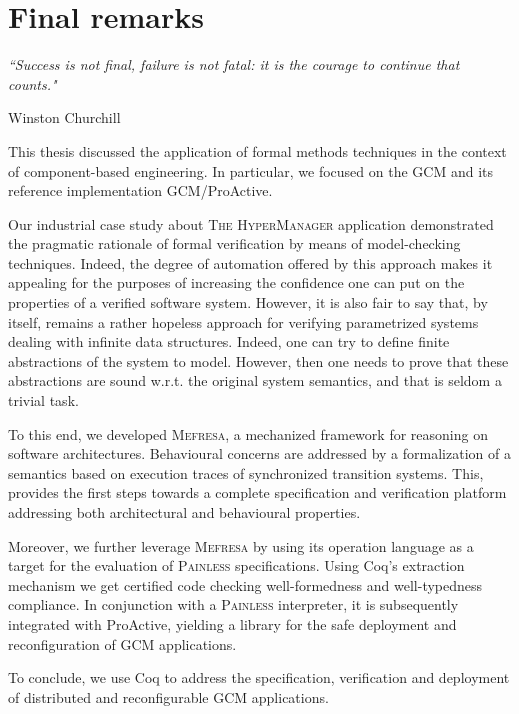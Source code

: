 
\chapter{Final remarks} 
\label{chap:conclusion} 

\epigraph{\textit{“Success is not final, failure is not fatal: it is the courage to continue that counts."}}{Winston Churchill}







		This thesis discussed the application of formal methods techniques in the context of 
	component-based engineering. In particular, we focused on the \ac{GCM} and its reference 
	implementation GCM/ProActive.    	

		Our industrial case study about 
	\textsc{The HyperManager} application demonstrated the pragmatic rationale of
	formal verification by means of model-checking techniques. Indeed, the degree of automation
	offered by this approach makes it appealing for the purposes of increasing the confidence
	one can put on the properties of a verified software system. However, it is also fair to say that,
	by itself, remains a rather hopeless approach for verifying parametrized systems dealing
	with infinite data structures. Indeed, one can try to define finite abstractions of 
	the system to model. However, then one needs to prove that these abstractions are sound 
	w.r.t. the original system semantics, and that is seldom a trivial task.
	
		To this end, we developed \textsc{Mefresa}, a mechanized framework for reasoning on software 
	architectures. Behavioural concerns are addressed by a formalization of
	a semantics based on execution traces of synchronized transition systems.
	This, provides the first steps towards a complete specification and verification
	platform addressing both architectural and behavioural properties. 
	
		Moreover, we further leverage \textsc{Mefresa} by using its \textsf{operation} language
	as a target for the evaluation of \textsc{Painless} specifications. Using Coq's extraction
	mechanism we get certified code checking well-formedness and well-typedness compliance.	
	In conjunction with a \textsc{Painless} interpreter, it is subsequently integrated with 
	ProActive, yielding a library for the safe deployment and reconfiguration of
	 \ac{GCM} applications.
		
		
	To conclude, we use Coq to address the specification, verification and deployment of
	distributed and reconfigurable \ac{GCM} applications. 

